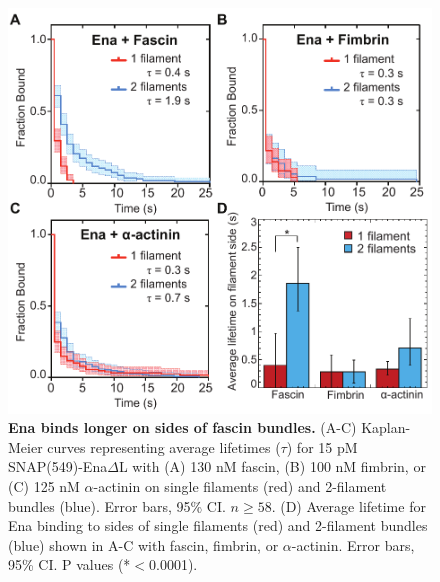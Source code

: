\begin{figure}
\centering
\includegraphics[width=13cm]{img/ch02/side_binding.pdf}
\caption[Ena binds longer on sides of fascin bundles.]{\textbf{Ena binds longer on sides of fascin bundles.} (A-C) Kaplan-Meier curves representing average lifetimes ($\tau$) for 15 pM SNAP(549)-Ena$\Delta$L with (A) 130 nM fascin, (B) 100 nM fimbrin, or (C) 125 nM $\alpha$-actinin on single filaments (red) and 2-filament bundles (blue). Error bars, 95\% CI. $n\geq 58$. (D) Average lifetime for Ena binding to sides of single filaments (red) and 2-filament bundles (blue) shown in A-C with fascin, fimbrin, or $\alpha$-actinin. Error bars, 95\% CI. P values (*$<$0.0001).}
\label{fig:ena-sidebinding}
\end{figure}

